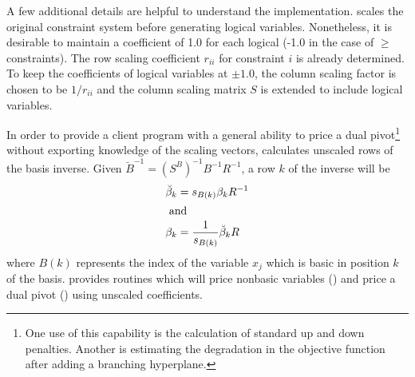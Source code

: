 A few additional details are helpful to understand the implementation.
\dylp scales the original constraint system before generating
logical variables.
Nonetheless, it is
desirable to maintain a coefficient of 1.0 for each logical (-1.0 in the
case of $\geq$ constraints).
The row scaling coefficient $r_{ii}$ for constraint $i$ is already determined.
To keep the coefficients of logical variables at $\pm1.0$, the column
scaling factor is chosen to be $1/r_{ii}$ and the column scaling matrix $S$
is extended to include logical variables.

In order to provide a client program with a general ability to price a dual
pivot\footnote{%
One use of this capability is the calculation of standard up and down
penalties.
Another is estimating the degradation in the objective function after
adding a branching hyperplane.}
without exporting knowledge of the scaling vectors,
\dylp calculates unscaled rows of the basis inverse.
Given $\breve{B}^{-1} = (S^B)^{-1} B^{-1} R^{-1}$, a row $k$ of the inverse
will be
\begin{align*}
\breve{\beta}_k & = s_{B(k)} \beta_k R^{-1} \\
\intertext{ and }
\beta_k & = \frac{1}{ s_{B(k)}} \breve{\beta}_k R
\end{align*}
where $B(k)$ represents the index of the variable $x_j$ which is basic in
position $k$ of the basis.
\dylp provides routines which will price nonbasic variables
() and price a dual pivot ()
using unscaled coefficients.
